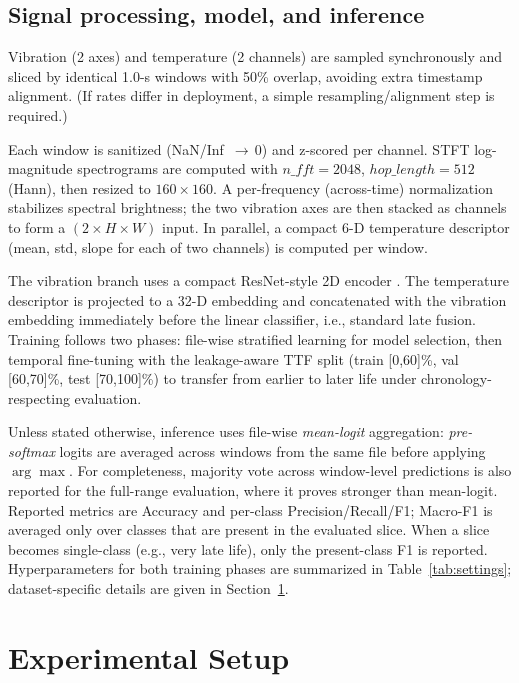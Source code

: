 \documentclass[pdflatex,sn-mathphys-num]{sn-jnl}%
\begin{document}
\subsection{Signal processing, model, and inference}
\label{sec:filewise}\label{sec:present}
Vibration (2 axes) and temperature (2 channels) are sampled synchronously and sliced by identical 1.0-s windows with 50\% overlap, avoiding extra timestamp alignment. (If rates differ in deployment, a simple resampling/alignment step is required.)

Each window is sanitized (NaN/Inf \,$\to$\,0) and z-scored per channel. STFT log-magnitude spectrograms are computed with $n\_{fft}=2048$, $hop\_length=512$ (Hann), then resized to $160\times160$. A per-frequency (across-time) normalization stabilizes spectral brightness; the two vibration axes are then stacked as channels to form a $(2\times H\times W)$ input. In parallel, a compact 6-D temperature descriptor (mean, std, slope for each of two channels) is computed per window.

The vibration branch uses a compact ResNet-style 2D encoder \cite{he2016resnet}. The temperature descriptor is projected to a 32-D embedding and concatenated with the vibration embedding immediately before the linear classifier, i.e., standard late fusion. Training follows two phases: file-wise stratified learning for model selection, then temporal fine-tuning with the leakage-aware TTF split (train [0,60]\%, val [60,70]\%, test [70,100]\%) to transfer from earlier to later life under chronology-respecting evaluation.

Unless stated otherwise, inference uses file-wise \emph{mean-logit} aggregation: \emph{pre-softmax} logits are averaged across windows from the same file before applying $\arg\max$. For completeness, majority vote across window-level predictions is also reported for the full-range evaluation, where it proves stronger than mean-logit. Reported metrics are Accuracy and per-class Precision/Recall/F1; Macro-F1 is averaged only over classes that are present in the evaluated slice. When a slice becomes single-class (e.g., very late life), only the present-class F1 is reported. Hyperparameters for both training phases are summarized in Table~\ref{tab:settings}; dataset-specific details are given in Section~\ref{sec:exp_setup}.


\section{Experimental Setup}
\label{sec:exp_setup}
\end{document}
